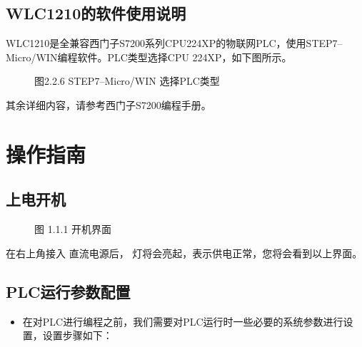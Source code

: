 \documentclass[a4paper,10pt,english]{sphinxmanual}
\begin{document}
\section{WLC\sphinxhyphen{}1210的软件使用说明}
\label{\detokenize{Product_Overview:id3}}
\sphinxAtStartPar
WLC\sphinxhyphen{}1210是全兼容西门子S7\sphinxhyphen{}200系列CPU224XP的物联网PLC，使用STEP7–Micro/WIN编程软件。PLC类型选择CPU 224XP，如下图所示。

\begin{figure}[htbp]
\centering
\capstart

\noindent{}
\caption{图2.2.6  STEP7–Micro/WIN 选择PLC类型}\label{\detokenize{Product_Overview:id17}}\end{figure}

\sphinxAtStartPar
其余详细内容，请参考西门子S7\sphinxhyphen{}200编程手册。


\chapter{操作指南}
\label{\detokenize{operation_guide:id1}}\label{\detokenize{operation_guide::doc}}

\section{上电开机}
\label{\detokenize{operation_guide:id2}}
\begin{figure}[htbp]
\centering
\capstart

\noindent{}
\caption{图 1.1.1 开机界面}\label{\detokenize{operation_guide:id3}}\end{figure}

\sphinxAtStartPar
在右上角接入  直流电源后， 灯将会亮起，表示供电正常，您将会看到以上界面。


\section{PLC运行参数配置}
\label{\detokenize{operation_guide:plc}}\begin{itemize}
\item {} 
\sphinxAtStartPar
在对PLC进行编程之前，我们需要对PLC运行时一些必要的系统参数进行设置，设置步骤如下：

\end{itemize}
\end{document}
